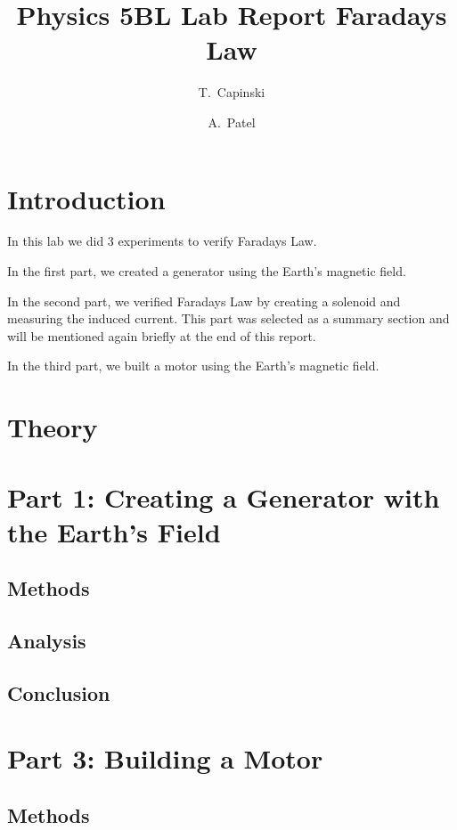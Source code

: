 \documentclass[11pt]{article}
\title{Physics 5BL Lab Report Faradays Law}
\author{T.~Capinski \and A.~Patel}
\let\oldsection\section
\renewcommand\section{\clearpage\oldsection}
\begin{document}
    \maketitle
    \tableofcontents

    \section*{Introduction}\label{sec:introduction}

    In this lab we did 3 experiments to verify Faradays Law. 
    
    In the first part, we created a generator using the Earth's magnetic field. 
    
    In the second part, we verified Faradays Law by creating a solenoid and measuring the induced current. This part was selected as a summary section and will be mentioned again briefly at the end of this report.
    
    In the third part, we built a motor using the Earth's magnetic field.


    \section*{Theory}\label{sec:theory}


    \section{Part 1: Creating a Generator with the Earth’s Field}\label{sec:part_1}
    \subsection{Methods}\label{subsec:part_1_methods}
    \subsection{Analysis}\label{subsec:part_1_analsysis}
    \subsection{Conclusion}\label{subsec:part_1_conclusion}

    \section{Part 3: Building a Motor }\label{sec:part_3}
    \subsection{Methods}\label{subsec:part_3_methods}
\end{document}
